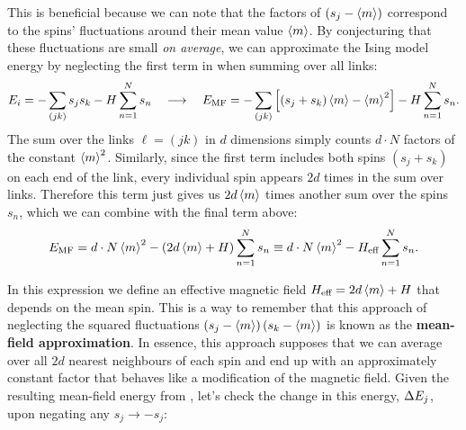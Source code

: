 This is beneficial because we can note that the factors of $\left(s_j - \left\langle m \right\rangle\right)$ correspond to the spins' fluctuations around their mean value $\left\langle m \right\rangle$.
By conjecturing that these fluctuations are small \textit{on average}, we can approximate the Ising model energy by neglecting the first term in  when summing over all links:
\begin{equation*}
  E_i = -\sum_{(jk)} s_j s_k - H \sum_{n = 1}^N s_n \quad \longrightarrow \quad E_{\text{MF}} = -\sum_{(jk)} \left[\left(s_j + s_k\right)\left\langle m \right\rangle - \left\langle m \right\rangle^2\right] - H \sum_{n = 1}^N s_n.
\end{equation*}
The sum over the links $\ell = (jk)$ in $d$ dimensions simply counts $d\cdot N$ factors of the constant $\left\langle m \right\rangle^2$.
Similarly, since the first term includes both spins $\left(s_j + s_k\right)$ on each end of the link, every individual spin appears $2d$ times in the sum over links.
Therefore this term just gives us $2d\left\langle m \right\rangle$ times another sum over the spins $s_n$, which we can combine with the final term above:
\begin{equation}
  \label{eq:MF_energy}
  E_{\text{MF}} = d\cdot N \left\langle m \right\rangle^2 - \left(2d\left\langle m \right\rangle + H\right) \sum_{n = 1}^N s_n \equiv d\cdot N \left\langle m \right\rangle^2 - H_{\text{eff}} \sum_{n = 1}^N s_n.
\end{equation}

In this expression we define an effective magnetic field $H_{\text{eff}} = 2d\left\langle m \right\rangle + H$ that depends on the mean spin.
This is a way to remember that this approach of neglecting the squared fluctuations $\left(s_j - \left\langle m \right\rangle\right) \left(s_k - \left\langle m \right\rangle\right)$ is known as the \textbf{mean-field approximation}.
In essence, this approach supposes that we can average over all $2d$ nearest neighbours of each spin and end up with an approximately constant factor that behaves like a modification of the magnetic field. %
Given the resulting mean-field energy \EMF from , let's check the change in this energy, $\Delta E_j$, upon negating any $s_j \to -s_j$:
\begin{mdframed}
  \ \\[120 pt]
\end{mdframed}

